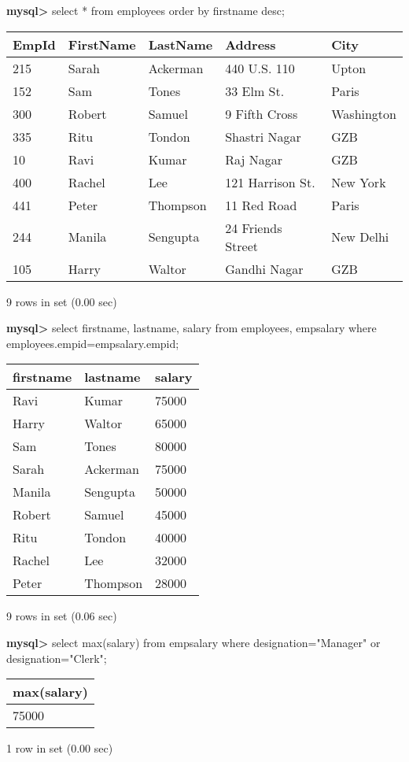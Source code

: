 \documentclass[11pt]{article}
\begin{document}
\textbf{mysql>} select * from employees order by firstname desc;
\begin{center}
\begin{tabular}{|l|l|l|l|l|}
\hline
EmpId & FirstName & LastName & Address & City \\
\hline
215 & Sarah & Ackerman & 440 U.S. 110 & Upton \\
152 & Sam & Tones & 33 Elm St. & Paris \\
300 & Robert & Samuel & 9 Fifth Cross & Washington \\
335 & Ritu & Tondon & Shastri Nagar & GZB \\
10 & Ravi & Kumar & Raj Nagar & GZB \\
400 & Rachel & Lee & 121 Harrison St. & New York \\
441 & Peter & Thompson & 11 Red Road & Paris \\
244 & Manila & Sengupta & 24 Friends Street & New Delhi \\
105 & Harry & Waltor & Gandhi Nagar & GZB \\
\hline
\end{tabular}
\end{center}
9 rows in set (0.00 sec)

\textbf{mysql>} select firstname, lastname, salary from employees, empsalary where employees.empid=empsalary.empid;
\begin{center}
\begin{tabular}{|l|l|l|}
\hline
firstname & lastname & salary \\
\hline
Ravi & Kumar & 75000 \\
Harry & Waltor & 65000 \\
Sam & Tones & 80000 \\
Sarah & Ackerman & 75000 \\
Manila & Sengupta & 50000 \\
Robert & Samuel & 45000 \\
Ritu & Tondon & 40000 \\
Rachel & Lee & 32000 \\
Peter & Thompson & 28000 \\
\hline
\end{tabular}
\end{center}
9 rows in set (0.06 sec)

\textbf{mysql>} select max(salary) from empsalary where designation="Manager" or designation="Clerk";
\begin{center}
\begin{tabular}{|l|}
\hline
max(salary) \\
\hline
75000 \\
\hline
\end{tabular}
\end{center}
1 row in set (0.00 sec)
\end{document}
